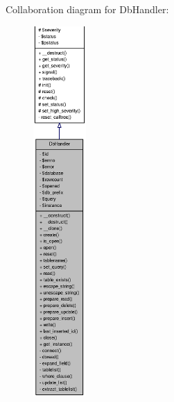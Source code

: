 Collaboration diagram for DbHandler:\nopagebreak
\begin{figure}[H]
\begin{center}
\leavevmode
\includegraphics[height=400pt]{classDbHandler__coll__graph}
\end{center}
\end{figure}

